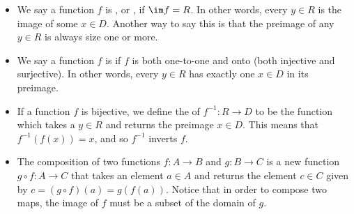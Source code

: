 \begin{definition}
\begin{itemize}
  \item We say a function $f$ is , or , if $\im f=R$.  In other words, every $y\in R$ is the image of some $x\in D$.  Another way to say this is that the preimage of any $y\in R$ is always size one or more.

  \item We say a function $f$ is  if $f$ is both one-to-one and onto (both injective and surjective).  In other words, every $y\in R$ has exactly one $x\in D$ in its preimage.

  \item If a function $f$ is bijective, we define the  of $f^{-1}\colon R\to D$ to be the function which takes a $y\in R$ and returns the preimage $x\in D$.  This means that $f^{-1}(f(x))=x$, and so $f^{-1}$ inverts $f$.

  \item The composition of two functions $f\colon A\to B$ and $g\colon B\to C$ is a new function $g\circ f\colon A\to C$ that takes an element $a\in A$ and returns the element $c\in C$ given by $c=(g\circ f)(a)=g(f(a))$. Notice that in order to compose two maps, the image of $f$ must be a subset of the domain of $g$.

\end{itemize}
\end{definition}


